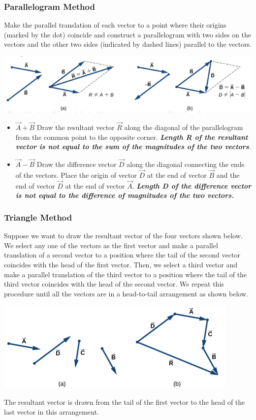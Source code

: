 \documentclass[12pt,addpoints]{exam}
\begin{document}
	\subsubsection*{Parallelogram Method}
	Make the parallel translation of each vector to a point where their origins (marked by the dot) coincide and construct a parallelogram with two sides on the vectors and the other two sides (indicated by dashed lines) parallel to the vectors. 
	\begin{center}
		\includegraphics[scale=0.5]{parallelogram.png}
	\end{center}
	\begin{itemize}
		\item $\vec{A}+\vec{B}$ Draw the resultant vector $\vec{R}$ along the diagonal of the parallelogram from the common point to the opposite corner. \textit{\textbf{Length R of the resultant vector is not equal to the sum of the magnitudes of the two vectors}}.
		\item $\vec{A}-\vec{B}$ Draw the difference vector $\vec{D}$ along the diagonal connecting the ends of the vectors. Place the origin of vector $\vec{D}$ at the end of vector $\vec{B}$ and the end of vector $\vec{D}$ at the end of vector $\vec{A}$. \textit{\textbf{Length D of the difference vector is not equal to the difference of magnitudes of the two vectors.}} 
	\end{itemize} 
	\subsubsection*{Triangle Method}
	 Suppose we want to draw the resultant vector of the four vectors shown below. We select any one of the vectors as the first vector and make a parallel translation of a second vector to a position where the tail of the second vector coincides with the head of the first vector. Then, we select a third vector and make a parallel translation of the third vector to a position where the tail of the third vector coincides with the head of the second vector. We repeat this procedure until all the vectors are in a head-to-tail arrangement as shown below.
	\begin{center}
		\includegraphics[scale=0.5]{triangle.png}
	\end{center}
	The resultant vector is drawn from the tail of the first vector to the head of the last vector in this arrangement.
\end{document}
